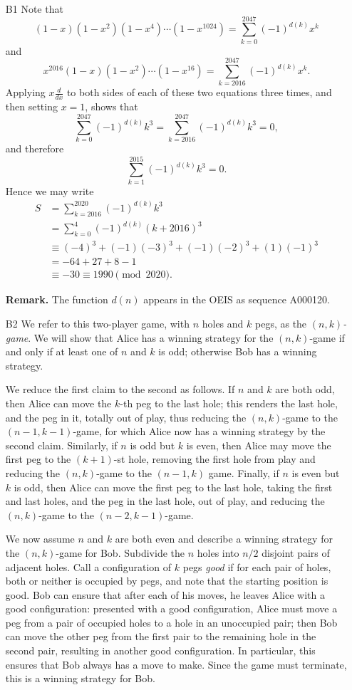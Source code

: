 \documentclass[amssymb,twocolumn,pra,10pt,aps]{revtex4-1}
\begin{document}
\begin{itemize}
\item[B1]
Note that
$$
(1-x)(1-x^2)(1-x^4)\cdots(1-x^{1024})=\sum_{k=0}^{2047}(-1)^{d(k)}x^k
$$
and
$$
x^{2016}(1-x)(1-x^2)\cdots(1-x^{16})=\sum_{k=2016}^{2047}(-1)^{d(k)}x^k.
$$
Applying $x\frac{d}{dx}$ to both sides of each of these two equations three times, and then setting $x=1$, shows that
$$
\sum_{k=0}^{2047}(-1)^{d(k)}k^3 = \sum_{k=2016}^{2047}(-1)^{d(k)}k^3 = 0,
$$
and therefore
$$
\sum_{k=1}^{2015}(-1)^{d(k)}k^3 = 0.
$$
Hence we may write
\begin{align*}
S &=\sum_{k=2016}^{2020}(-1)^{d(k)}k^3 \\
 &= \sum_{k=0}^4 (-1)^{d(k)} (k+2016)^3 \\
&\equiv (-4)^3 + (-1)(-3)^3+(-1)(-2)^3+(1)(-1)^3 \\
&= -64+27+8-1 \\
&\equiv -30\equiv 1990\pmod{2020}.
\end{align*}

\noindent
\textbf{Remark.} The function $d(n)$ appears in the OEIS as sequence A000120.

\item[B2]
We refer to this two-player game, with $n$ holes and $k$ pegs, as the \emph{$(n,k)$-game}.
We will show that Alice has a winning strategy for the $(n,k)$-game if and only if at least one of $n$ and $k$ is odd; otherwise Bob has a winning strategy.

We reduce the first claim to the second as follows. If $n$ and $k$ are both odd, then Alice can move the $k$-th peg to the last hole; this renders the last hole, and the peg in it, totally out of play, thus reducing the $(n,k)$-game to the $(n-1,k-1)$-game, for which Alice now has a winning strategy by the second claim. Similarly, if $n$ is odd but $k$ is even, then Alice may move the first peg to the $(k+1)$-st hole, removing the first hole from play and reducing the $(n,k)$-game to the $(n-1,k)$ game. Finally, if $n$ is even but $k$ is odd, then Alice can move the first peg to the last hole, taking the first and last holes, and the peg in the last hole, out of play, and reducing the $(n,k)$-game to the $(n-2,k-1)$-game.

We now assume $n$ and $k$ are both even and describe a winning strategy for the $(n,k)$-game for Bob.
Subdivide the $n$ holes into $n/2$ disjoint pairs of adjacent holes. Call a configuration of $k$ pegs \textit{good} if for each pair of holes, both or neither is occupied by pegs, and note that the starting position is good. Bob can ensure that after each of his moves, he leaves Alice with a good configuration: presented with a good configuration, Alice must move a peg from a pair of occupied holes to a hole in an unoccupied pair; then Bob can move the other peg from the first pair to the remaining hole in the second pair, resulting in another good configuration. In particular, this ensures that Bob always has a move to make. Since the game must terminate, this is a winning strategy for Bob.


\end{itemize}
\end{document}
